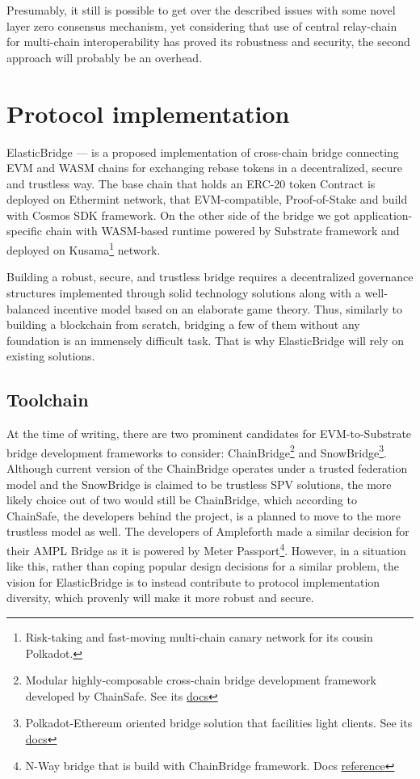 \documentclass{article}
\begin{document}
Presumably, it still is possible to get over the described issues with some novel layer zero consensus mechanism, yet considering that use of central relay-chain for multi-chain interoperability has proved its robustness and security, the second approach will probably be an overhead.

\section{Protocol implementation}

ElasticBridge --- is a proposed implementation of cross-chain bridge connecting EVM and WASM chains for exchanging rebase tokens in a decentralized, secure and trustless way. The base chain that holds an ERC-20 token Contract is deployed on Ethermint network, that EVM-compatible, Proof-of-Stake and build with Cosmos SDK framework. On the other side of the bridge we got application-specific chain with WASM-based runtime powered by Substrate framework and deployed on Kusama\footnote{Risk-taking and fast-moving multi-chain canary network for its cousin Polkadot.} network.

Building a robust, secure, and trustless bridge requires a decentralized governance structures implemented through solid technology solutions along with a well-balanced incentive model based on an elaborate game theory. Thus, similarly to building a blockchain from scratch, bridging a few of them without any foundation is an immensely difficult task. That is why ElasticBridge will rely on existing solutions.

\subsection{Toolchain}

At the time of writing, there are two prominent candidates for EVM-to-Substrate bridge development frameworks to consider: ChainBridge\footnote{Modular highly-composable cross-chain bridge development framework developed by ChainSafe. See its \href{https://chainbridge.chainsafe.io}{docs}} and SnowBridge\footnote{Polkadot-Ethereum oriented bridge solution that facilities light clients. See its \href{https://snowbridge-docs.snowfork.com}{docs}}. Although current version of the ChainBridge operates under a trusted federation model and the SnowBridge is claimed to be trustless SPV solutions, the more likely choice out of two would still be ChainBridge, which according to ChainSafe, the developers behind the project, is a planned to move to the more trustless model as well. The developers of Ampleforth made a similar decision for their AMPL Bridge as it is powered by Meter Passport\footnote{N-Way bridge that is build with ChainBridge framework. Docs \href{https://docs.meter.io/passport}{reference}}. However, in a situation like this, rather than coping popular design decisions for a similar problem, the vision for ElasticBridge is to instead contribute to protocol implementation diversity, which provenly will make it more robust and secure.
\end{document}
